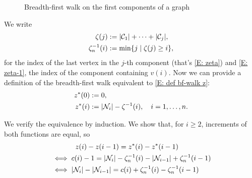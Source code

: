 \begin{figure}[H]
	
	\centering
	\\
	
	\centering
	\\
	
	\centering
	
	\caption{Breadth-first walk on the first components of a graph}
	\label{F: bf-walk discrete}
\end{figure} 


We write
\begin{align}
\zeta(j) &:= |\mathcal{C}_{1}| + \dots + |\mathcal{C}_{j}|, \label{E: zeta}\\ 
\zeta^{-1}_n(i) &:= \min \{ j \; | \; \zeta(j) \geq i \}, \label{E: zeta-1}
\end{align}
for the index of the last vertex in the $j$-th component (that's \eqref{E: zeta})
and \eqref{E: zeta-1}, the index of the component containing $v(i)$.
Now we can provide a definition of the breadth-first walk equivalent to \eqref{E: def bf-walk z}:
\begin{equation}  \label{E: def bf-walk z*}
\begin{aligned}
z^*(0) &:= 0, \\
z^*(i) &:= |\mathcal{N}_{i}| - \zeta^{-1}(i), \quad i=1, \dots , n.
\end{aligned}
\end{equation}

We verify the equivalence by induction.
We show that, for $i \geq 2$, increments of both functions are equal,
so
\begin{equation} \label{E: equality z z*}
\begin{aligned} 
&\hspace{35pt} z(i) - z(i-1) = z^*(i)  -z^*(i-1) \\
&\iff c(i) - 1 = |\mathcal{N}_{i}| - \zeta^{-1}_n(i) - |\mathcal{N}_{i-1}| + \zeta^{-1}_n(i-1) \\
&\iff |\mathcal{N}_{i}| - |\mathcal{N}_{i-1}| = c(i) + \zeta^{-1}_n(i) - \zeta^{-1}_n(i-1)
\end{aligned}
\end{equation}

